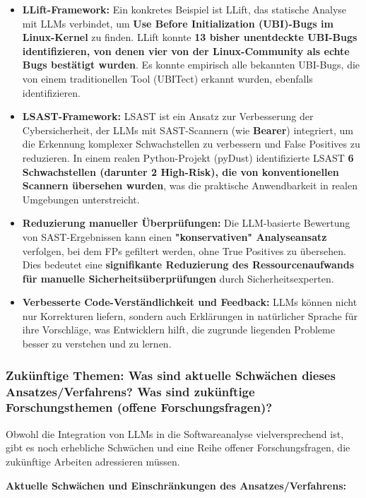 \begin{itemize}
    \item \textbf{LLift-Framework:} Ein konkretes Beispiel ist LLift, das statische Analyse mit LLMs verbindet, um \textbf{Use Before Initialization (UBI)-Bugs im Linux-Kernel} zu finden. LLift konnte \textbf{13 bisher unentdeckte UBI-Bugs identifizieren, von denen vier von der Linux-Community als echte Bugs bestätigt wurden}. Es konnte empirisch alle bekannten UBI-Bugs, die von einem traditionellen Tool (UBITect) erkannt wurden, ebenfalls identifizieren.
    \item \textbf{LSAST-Framework:} LSAST ist ein Ansatz zur Verbesserung der Cybersicherheit, der LLMs mit SAST-Scannern (wie \textbf{Bearer}) integriert, um die Erkennung komplexer Schwachstellen zu verbessern und False Positives zu reduzieren. In einem realen Python-Projekt (pyDust) identifizierte LSAST \textbf{6 Schwachstellen (darunter 2 High-Risk), die von konventionellen Scannern übersehen wurden}, was die praktische Anwendbarkeit in realen Umgebungen unterstreicht.
    \item \textbf{Reduzierung manueller Überprüfungen:} Die LLM-basierte Bewertung von SAST-Ergebnissen kann einen \textbf{"konservativen" Analyseansatz} verfolgen, bei dem FPs gefiltert werden, ohne True Positives zu übersehen. Dies bedeutet eine \textbf{signifikante Reduzierung des Ressourcenaufwands für manuelle Sicherheitsüberprüfungen} durch Sicherheitsexperten.
    \item \textbf{Verbesserte Code-Verständlichkeit und Feedback:} LLMs können nicht nur Korrekturen liefern, sondern auch Erklärungen in natürlicher Sprache für ihre Vorschläge, was Entwicklern hilft, die zugrunde liegenden Probleme besser zu verstehen und zu lernen.
\end{itemize}

\subsubsection*{Zukünftige Themen: Was sind aktuelle Schwächen dieses Ansatzes/Verfahrens? Was sind zukünftige Forschungsthemen (offene Forschungsfragen)?}

Obwohl die Integration von LLMs in die Softwareanalyse vielversprechend ist, gibt es noch erhebliche Schwächen und eine Reihe offener Forschungsfragen, die zukünftige Arbeiten adressieren müssen.

\textbf{Aktuelle Schwächen und Einschränkungen des Ansatzes/Verfahrens:}

